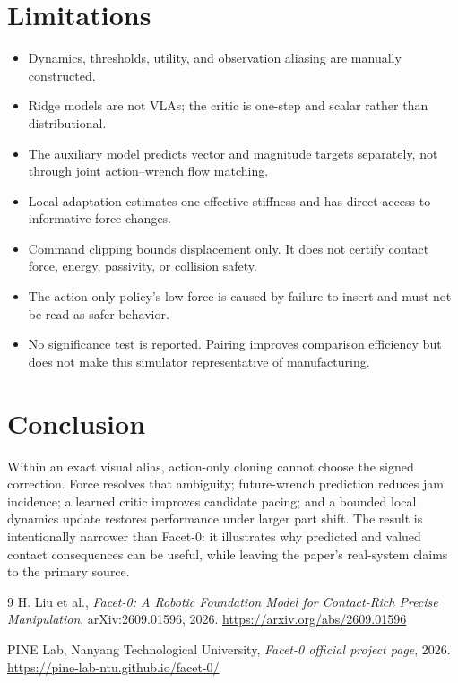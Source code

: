 \documentclass[11pt]{article}
\begin{document}
\section{Limitations}
\begin{itemize}[leftmargin=1.5em]
  \item Dynamics, thresholds, utility, and observation aliasing are manually constructed.
  \item Ridge models are not VLAs; the critic is one-step and scalar rather than distributional.
  \item The auxiliary model predicts vector and magnitude targets separately, not through joint action--wrench flow matching.
  \item Local adaptation estimates one effective stiffness and has direct access to informative force changes.
  \item Command clipping bounds displacement only. It does not certify contact force, energy, passivity, or collision safety.
  \item The action-only policy's low force is caused by failure to insert and must not be read as safer behavior.
  \item No significance test is reported. Pairing improves comparison efficiency but does not make this simulator representative of manufacturing.
\end{itemize}

\section{Conclusion}
Within an exact visual alias, action-only cloning cannot choose the signed correction. Force resolves that ambiguity; future-wrench prediction reduces jam incidence; a learned critic improves candidate pacing; and a bounded local dynamics update restores performance under larger part shift. The result is intentionally narrower than Facet-0: it illustrates why predicted and valued contact consequences can be useful, while leaving the paper's real-system claims to the primary source.

\begin{thebibliography}{9}
H. Liu et al., \emph{Facet-0: A Robotic Foundation Model for Contact-Rich Precise Manipulation}, arXiv:2609.01596, 2026. \url{https://arxiv.org/abs/2609.01596}

PINE Lab, Nanyang Technological University, \emph{Facet-0 official project page}, 2026. \url{https://pine-lab-ntu.github.io/facet-0/}
\end{thebibliography}
\end{document}
